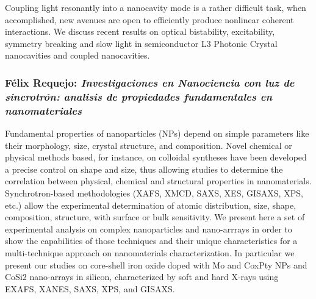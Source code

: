 Coupling light resonantly into a nanocavity mode is a
rather difficult task, when accomplished, new avenues are open to
efficiently produce nonlinear coherent interactions. We discuss recent
results on optical bistability, excitability, symmetry breaking and
slow light in semiconductor L3 Photonic Crystal nanocavities and
coupled nanocavities.

\subsubsection*{F\'elix Requejo: \textit{Investigaciones en Nanociencia con luz
de sincrotr\'on: analisis de propiedades fundamentales en nanomateriales}}

Fundamental properties of nanoparticles (NPs) depend on simple parameters like
their morphology, size, crystal structure, and composition. Novel chemical or
physical methods based, for instance, on colloidal syntheses have been developed
a precise control on shape and size, thus allowing studies to determine the
correlation between physical, chemical and structural properties in
nanomaterials. Synchrotron-based methodologies (XAFS, XMCD, SAXS, XES, GISAXS,
XPS, etc.) allow the experimental determination of atomic distribution, size,
shape, composition, structure, with surface or bulk sensitivity. We present here
a set of experimental analysis on complex nanoparticles and nano-arrrays in
order to show the capabilities of those techniques and their unique
characteristics for a multi-technique approach on nanomaterials
characterization. In particular we present our studies on core-shell iron oxide
doped with Mo and CoxPty NPs and CoSi2 nano-arrays in silicon, characterized by
soft and hard X-rays using EXAFS, XANES, SAXS, XPS, and GISAXS.